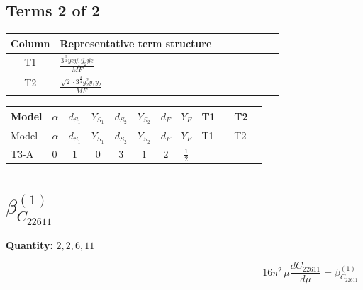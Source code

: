\documentclass[8pt]{article}
\begin{document}
\begin{landscape}
\subsection*{Terms 2 of 2}
\begin{center}
\begin{tabular}{@{}c >{\raggedright\arraybackslash}p{0.82\linewidth}@{}}
\toprule
Column & Representative term structure \\
\midrule
T1 & \(\displaystyle \frac{3^{\frac{3}{4}} ye \overline{y_{1}} \overline{y_{2}} \overline{ye}}{MF}\) \\
\midrule
T2 & \(\displaystyle \frac{\sqrt{2} \cdot 3^{\frac{3}{4}} g_{2}^{2} \overline{y_{1}} \overline{y_{2}}}{MF}\) \\
\midrule
\bottomrule
\end{tabular}
\end{center}
\smallskip
\tiny
\begin{longtable}{@{}llcccccc >{\raggedright\arraybackslash}p{0.21\linewidth} >{\raggedright\arraybackslash}p{0.21\linewidth}@{}}
\toprule
Model & $\alpha$ & $d_{S_1}$ & $Y_{S_1}$ & $d_{S_2}$ & $Y_{S_2}$ & $d_F$ & $Y_F$ & T1 & T2 \\
\midrule
\endfirsthead
\toprule
Model & $\alpha$ & $d_{S_1}$ & $Y_{S_1}$ & $d_{S_2}$ & $Y_{S_2}$ & $d_F$ & $Y_F$ & T1 & T2 \\
\midrule
\endhead
T3-A & $0$ & $1$ & $0$ & $3$ & $1$ & $2$ & $\frac{1}{2}$ & \scriptsize\adjustbox{max width=\linewidth}{$\begin{gathered} - \frac{3^{\frac{3}{4}} ye \overline{y_{1}} \overline{y_{2}} \overline{ye}}{12 MF}\end{gathered}$} & \scriptsize\adjustbox{max width=\linewidth}{$\begin{gathered} \frac{\sqrt{2} \cdot 3^{\frac{3}{4}} g_{2}^{2} \overline{y_{1}} \overline{y_{2}}}{3 MF}\end{gathered}$} \\
\midrule
\bottomrule
\end{longtable}
\clearpage
\section*{$\beta_{C_{22611}}^{(1)}$}
\noindent\textbf{Quantity: }$\mathrm{2,2,6,11}$\par\smallskip
\[16\pi^2\,\mu\frac{d C_{22611}}{d\mu}=\beta_{C_{22611}}^{(1)}\]

\end{landscape}
\end{document}

